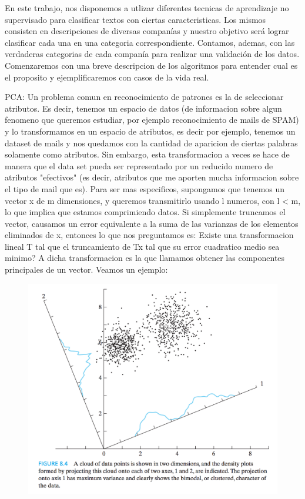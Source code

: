 En este trabajo, nos disponemos a utlizar diferentes tecnicas de aprendizaje no supervisado para clasificar textos con ciertas caracteristicas. Los mismos consisten en descripciones de diversas companías y nuestro objetivo será lograr clasificar cada una en una categoria correspondiente. Contamos, ademas, con las verdaderas categorias de cada companía para realizar una validación de los datos.
Comenzaremos con una breve descripcion de los algoritmos para entender cual es el proposito y ejemplificaremos con casos de la vida real.

PCA:
Un problema comun en reconocimiento de patrones es la de seleccionar atributos. Es decir, tenemos un espacio de datos (de informacion sobre algun fenomeno que queremos estudiar, por ejemplo reconocimiento de mails de SPAM) y lo transformamos en un espacio de atributos, es decir por ejemplo, tenemos un dataset de mails y nos quedamos con la cantidad de aparicion de ciertas palabras solamente como atributos. Sin embargo, esta transformacion a veces se hace de manera que el data set pueda ser representado por un reducido numero de atributos "efectivos" (es decir, atributos que me aporten mucha informacion sobre el tipo de mail que es). Para ser mas especificos, supongamos que tenemos un vector x de m dimensiones, y queremos transmitirlo usando l numeros, con l < m, lo que implica que estamos comprimiendo datos. Si simplemente truncamos el vector, causamos un error equivalente a la suma de las varianzas de los elementos eliminados de x, entonces lo que nos preguntamos es: Existe una transformacion lineal T tal que el truncamiento de Tx tal que su error cuadratico medio sea minimo? A dicha transformacion es la que llamamos obtener las componentes principales de un vector. Veamos un ejemplo:

\begin{figure}[h!]
  \centering
  \includegraphics[width=.6\linewidth]{img/pca/dispersion}
\label{fig:test}
\end{figure}

